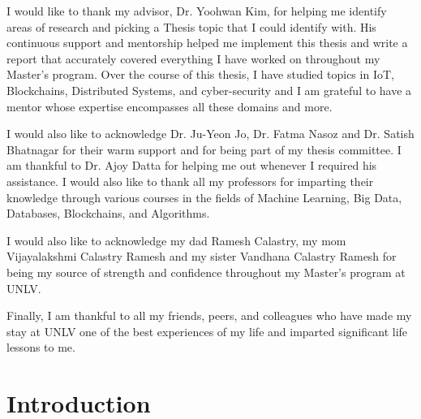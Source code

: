 \documentclass[11pt,openright]{report}
\begin{document}
\begin{thesisacknowledgments}
I would like to thank my advisor, Dr. Yoohwan Kim, for helping me identify areas of research and picking a Thesis topic that I could identify with. His continuous support and mentorship helped me implement this thesis and write a report that accurately covered everything I have worked on throughout my Master's program. Over the course of this thesis, I have studied topics in IoT, Blockchains, Distributed Systems, and cyber-security and I am grateful to have a mentor whose expertise encompasses all these domains and more.

I would also like to acknowledge  Dr. Ju-Yeon Jo, Dr. Fatma Nasoz and Dr. Satish Bhatnagar for their warm support and for being part of my thesis committee. I am thankful to Dr. Ajoy Datta for helping me out whenever I required his assistance. I would also like to thank all my professors for imparting their knowledge through various courses in the fields of Machine Learning, Big Data, Databases, Blockchains, and Algorithms.

I would also like to acknowledge my dad Ramesh Calastry, my mom Vijayalakshmi Calastry Ramesh and my sister Vandhana Calastry Ramesh for being my source of strength and confidence throughout my Master's program at UNLV.

Finally, I am thankful to all my friends, peers, and colleagues who have made my stay at UNLV one of the best experiences of my life and imparted significant life lessons to me. 
\end{thesisacknowledgments}

\pagestyle{plain}

\tableofcontents
\clearpage
\listoftables
\clearpage
\listoffigures
\clearpage
\listofalgorithms
{}
\clearpage

\chapter{Introduction}\label{chapter:introduction} 
\end{document}
